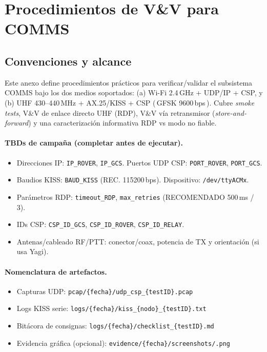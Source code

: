 
\section*{Procedimientos de V\&V para COMMS}
\label{sec:vv_procedures_comms}

\subsection*{Convenciones y alcance}
Este anexo define procedimientos prácticos para verificar/validar el subsistema COMMS bajo los
dos medios soportados: (a) Wi-Fi 2.4\,GHz + UDP/IP + CSP, y (b) UHF 430–440\,MHz + AX.25/KISS + CSP
(\,GFSK 9600\,bps\,). Cubre \emph{smoke tests}, V\&V de enlace directo UHF (RDP), V\&V vía retransmisor
(\emph{store-and-forward}) y una caracterización informativa RDP vs modo no fiable.

\paragraph{TBDs de campaña (completar antes de ejecutar).}
\begin{itemize}
  \item Direcciones IP: \texttt{IP\_ROVER}, \texttt{IP\_GCS}. Puertos UDP CSP: \texttt{PORT\_ROVER}, \texttt{PORT\_GCS}.
  \item Baudios KISS: \texttt{BAUD\_KISS} (REC. 115200\,bps). Dispositivo: \texttt{/dev/ttyACMx}.
  \item Parámetros RDP: \texttt{timeout\_RDP}, \texttt{max\_retries} (RECOMENDADO 500\,ms / 3).
  \item IDs CSP: \texttt{CSP\_ID\_GCS}, \texttt{CSP\_ID\_ROVER}, \texttt{CSP\_ID\_RELAY}.
  \item Antenas/cableado RF/PTT: conector/coax, potencia de TX y orientación (si usa Yagi).
\end{itemize}

\paragraph{Nomenclatura de artefactos.}
\begin{itemize}
  \item Capturas UDP: \texttt{pcap/\{fecha\}/udp\_csp\_\{testID\}.pcap}
  \item Logs KISS serie: \texttt{logs/\{fecha\}/kiss\_\{nodo\}\_\{testID\}.txt}
  \item Bitácora de consignas: \texttt{logs/\{fecha\}/checklist\_\{testID\}.md}
  \item Evidencia gráfica (opcional): \texttt{evidence/\{fecha\}/screenshots/\*.png}
\end{itemize}

